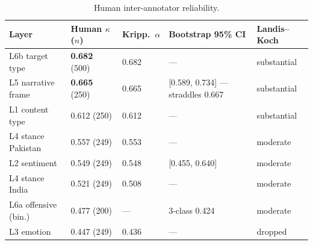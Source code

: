 \begin{table}[t]
  \caption{Human inter-annotator reliability.}
  \label{tab:humaniaa}
  \small
  \begin{tabular}{@{}lllp{4.2cm}l@{}}
    \toprule
    Layer & Human $\kappa$ ($n$) & Kripp.\ $\alpha$ & Bootstrap 95\% CI & Landis--Koch \\
    \midrule
    L6b target type      & \textbf{0.682} (500) & 0.682 & --- & substantial \\
    L5 narrative frame   & \textbf{0.665} (250) & 0.665 & [0.589, 0.734] --- straddles 0.667 & substantial \\
    L1 content type      & 0.612 (250) & 0.612 & --- & substantial \\
    L4 stance Pakistan   & 0.557 (249) & 0.553 & --- & moderate \\
    L2 sentiment         & 0.549 (249) & 0.548 & [0.455, 0.640] & moderate \\
    L4 stance India      & 0.521 (249) & 0.508 & --- & moderate \\
    L6a offensive (bin.) & 0.477 (200) & ---   & 3-class 0.424 & moderate \\
    L3 emotion           & 0.447 (249) & 0.436 & --- & dropped \\
    \bottomrule
  \end{tabular}
\end{table}
